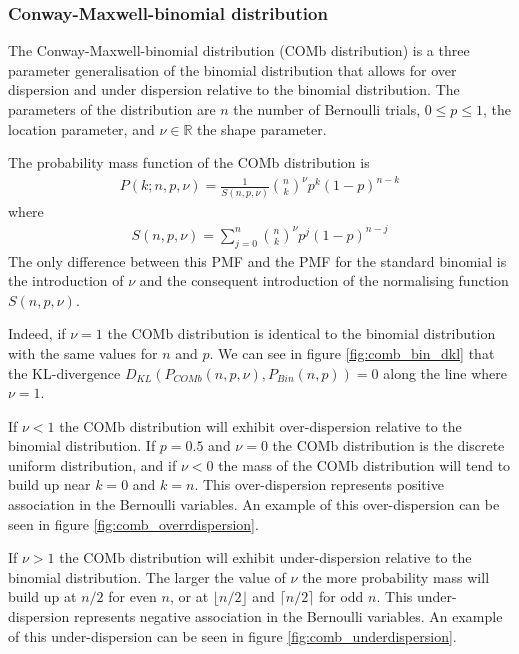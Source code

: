 \documentclass[a4paper,12pt]{article}
\theoremstyle{definition}
\begin{document}
      \subsubsection{Conway-Maxwell-binomial distribution}
      The Conway-Maxwell-binomial distribution (COMb distribution) is a three parameter generalisation of the binomial distribution that allows for over dispersion and under dispersion relative to the binomial distribution. The parameters of the distribution are $n$ the number of Bernoulli trials, $0 \leq p \leq 1$, the location parameter, and $\nu \in \mathbb{R}$ the shape parameter.

      The probability mass function of the COMb distribution is
      \begin{align}\label{eq:comb_pmf}
        P(k;n,p,\nu) = \frac{1}{S(n,p,\nu)}\binom{n}{k}^{\nu} p^k (1-p)^{n-k}
      \end{align}
      where
      \begin{align}\label{eq:comb_norm}
        S(n,p,\nu) = \sum_{j=0}^n \binom{n}{k}^{\nu} p^j (1-p)^{n-j}
      \end{align}
      The only difference between this PMF and the PMF for the standard binomial is the introduction of $\nu$ and the consequent introduction of the normalising function $S(n,p,\nu)$.

      Indeed, if $\nu = 1$ the COMb distribution is identical to the binomial distribution with the same values for $n$ and $p$. We can see in figure \ref{fig:comb_bin_dkl} that the KL-divergence $D_{KL}(P_{COMb}(n,p,\nu), P_{Bin}(n,p))=0$ along the line where $\nu=1$.

      If $\nu < 1$ the COMb distribution will exhibit over-dispersion relative to the binomial distribution. If $p=0.5$ and $\nu=0$ the COMb distribution is the discrete uniform distribution, and if $\nu < 0$ the mass of the COMb distribution will tend to build up near $k=0$ and $k=n$. This over-dispersion represents positive association in the Bernoulli variables. An example of this over-dispersion can be seen in figure \ref{fig:comb_overrdispersion}.

      If $\nu > 1$ the COMb distribution will exhibit under-dispersion relative to the binomial distribution. The larger the value of $\nu$ the more probability mass will build up at $n/2$ for even $n$, or at $\lfloor n/2 \rfloor$ and $\lceil n/2 \rceil$ for odd $n$. This under-dispersion represents negative association in the Bernoulli variables. An example of this under-dispersion can be seen in figure \ref{fig:comb_underdispersion}.
\end{document}

